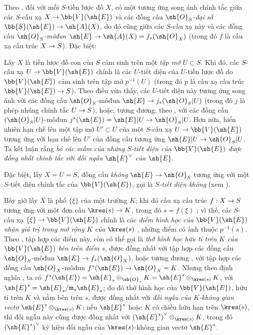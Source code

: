 \documentclass[oneside,10pt]{amsart}
\makeatletter
\providecommand{\dual}{}\renewcommand{\dual}[1]{{#1}^{\vee}}
\newcommand{\ega@arrow}[2]{\mathchoice{#1}{#2}{#2}{#2}}
\renewcommand{\to}{\ega@arrow{\longrightarrow}{\rightarrow}}
\newcommand{\oldpage}[2][]{\marginnote{\normalfont\footnotesize\textbf{#1}~|~#2}\ignorespaces}
\let\EGAOriginalLabel\label
\renewcommand{\label}[1]{\phantomsection\EGAOriginalLabel{#1}}
\makeatother
\begin{document}
Theo , đối với mỗi $S$-tiền lược đồ $X$, có một tương ứng song ánh chính tắc giữa các $S$-cấu xạ $X\to\bb{V}(\sh{E})$ và các đồng cấu \emph{$\sh{O}_S$-đại số $\bb{S}(\sh{E})\to\sh{A}(X)$}, do đó cũng giữa các $S$-cấu xạ này và các đồng cấu \emph{$\sh{O}_S$-môđun $\sh{E}\to\sh{A}(X)=f_*(\sh{O}_X)$} (trong đó $f$ là cấu xạ cấu trúc $X\to S$).
Đặc biệt:
\begin{env}[1.7.9]
\label{II.1.7.9}
Lấy $X$ là tiền lược đồ con của $S$ cảm sinh trên một \emph{tập mở $U\subset S$}.
Khi đó, các $S$-cấu xạ $U\to\bb{V}(\sh{E})$ chính là các $U$-tiết diện  của $U$-tiền lược đồ do $\bb{V}(\sh{E})$ cảm sinh trên tập mở $p^{-1}(U)$ (trong đó $p$ là cấu xạ cấu trúc $\bb{V}(\sh{E})\to S$).
Theo điều vừa thấy, các $U$-tiết diện này tương ứng song ánh với các đồng cấu $\sh{O}_S$-môđun $\sh{E}\to j_*(\sh{O}_S|U)$ (trong đó $j$ là phép nhúng chính tắc $U\to S$), hoặc,
\oldpage[II]{17}
tương đương, theo , với các đồng cấu $(\sh{O}_S|U)$-môđun $j^*(\sh{E})=\sh{E}|U\to\sh{O}_S|U$.
Hơn nữa, hiển nhiên hạn chế lên một tập mở $U'\subset U$ của một $S$-cấu xạ $U\to\bb{V}(\sh{E})$ tương ứng với hạn chế lên $U'$ của đồng cấu tương ứng $\sh{E}|U\to\sh{O}_S|U$.
Ta kết luận rằng \emph{bó các mầm của những $S$-tiết diện của $\bb{V}(\sh{E})$ được đồng nhất chính tắc với đối ngẫu $\dual{\sh{E}}$ của $\sh{E}$}.

Đặc biệt, lấy $X=U=S$, đồng cấu \emph{không} $\sh{E}\to\sh{O}_S$ tương ứng với một $S$-tiết diện chính tắc của $\bb{V}(\sh{E})$, gọi là \emph{$S$-tiết diện không} (xem ).
\end{env}

\begin{env}[1.7.10]
\label{II.1.7.10}
Bây giờ lấy $X$ là phổ $\{\xi\}$ của một trường $K$; khi đó cấu xạ cấu trúc $f:X\to S$ tương ứng với một đơn cấu $\kres(s)\to K$, trong đó $s=f(\xi)$ ; vì thế, các $S$-cấu xạ $\{\xi\}\to\bb{V}(\sh{E})$ chính là các \emph{điểm hình học của $\bb{V}(\sh{E})$ nhận giá trị trong mở rộng $K$ của $\kres(s)$} , những điểm có ảnh thuộc $p^{-1}(s)$.
Theo , tập hợp các điểm này, còn có thể gọi là \emph{thớ hình học hữu tỉ trên $K$ của $\bb{V}(\sh{E})$ bên trên điểm $s$}, được đồng nhất với tập hợp các đồng cấu $\sh{O}_S$-môđun $\sh{E}\to f_*(\sh{O}_X)$, hoặc tương đương , với tập hợp các đồng cấu $\sh{O}_X$-môđun $f^*(\sh{E})\to\sh{O}_X=K$.
Nhưng theo định nghĩa , ta có $f^*(\sh{E})=\sh{E}_s\otimes_{\sh{O}_s}K=\sh{E}^s\otimes_{\kres(s)}K$, với $\sh{E}^s=\sh{E}_s/\mathfrak{m}_s\sh{E}_s$; do đó thớ hình học của $\bb{V}(\sh{E})$, hữu tỉ trên $K$ và nằm bên trên $s$, được đồng nhất với \emph{đối ngẫu của $K$-không gian vectơ $\sh{E}^s\otimes_{\kres(s)}K$}; nếu $\sh{E}^s$ hoặc $K$ có chiều hữu hạn trên $\kres(s)$, thì đối ngẫu này cũng được đồng nhất với $\dual{(\sh{E}^s)}\otimes_{\kres(s)}K$, trong đó $\dual{(\sh{E}^s)}$ ký hiệu đối ngẫu của $\kres(s)$-không gian vectơ $\sh{E}^s$.
\end{env}
\end{document}
